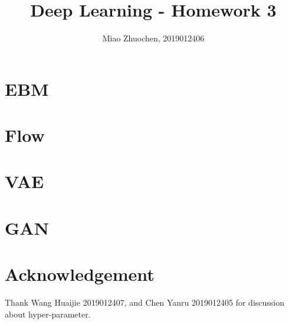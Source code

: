 \documentclass{article}
\title{\bf\huge Deep Learning - Homework 3}
\author{Miao Zhuochen, 2019012406}
\date{}
\begin{document}
\maketitle

\section*{EBM}

\section*{Flow}

\section*{VAE}

\section*{GAN}




\section*{Acknowledgement}

Thank Wang Huaijie 2019012407, and Chen Yanru 2019012405 for discussion about hyper-parameter.
\end{document}
